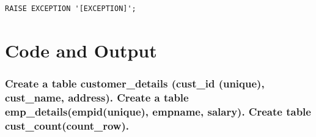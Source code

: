 \begin{verbatim}
RAISE EXCEPTION '[EXCEPTION]';
\end{verbatim}

\section{{Code and Output}}

\subsubsection{Create a table customer\_details (cust\_id (unique), cust\_name, address).\newline
Create a table emp\_details(empid(unique), empname, salary).\newline
Create table cust\_count(count\_row).\newline
}

